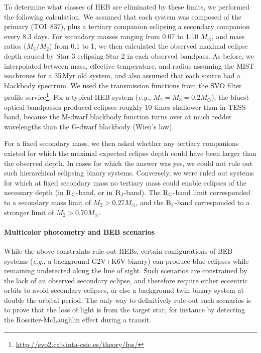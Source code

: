 \documentclass[12pt,twocolumn,tighten]{aastex63}
\newcommand{\tn}{TOI~837} %
\begin{document}
To determine what classes of HEB are eliminated by these limits, we
performed the following calculation.  We assumed that each system was
composed of the primary (\tn), plus a tertiary companion eclipsing a
secondary companion every 8.3 days.  For secondary masses ranging from
0.07 to 1.10 $M_\odot$, and mass ratios ($M_3/M_2$) from 0.1 to 1, we
then calculated the observed maximal eclipse depth caused by Star 3
eclipsing Star 2 in each observed bandpass.  As before, we
interpolated between mass, effective temperature, and radius assuming
the MIST isochrones for a 35$\,$Myr old system, and also assumed that
each source had a blackbody spectrum.  We used the transmission
functions from the SVO filter profile
service\footnote{\url{http://svo2.cab.inta-csic.es/theory/fps/}}.  For
a typical HEB system ({\it e.g.}, $M_2=M_3=0.2M_\odot$), the bluest
optical bandpasses produced eclipses roughly 10 times shallower than
in TESS-band, because the M-dwarf blackbody function turns over at
much redder wavelengths than the G-dwarf blackbody (Wien's law).

For a fixed secondary mass, we then asked whether any tertiary
companions existed for which the maximal expected eclipse depth could have
been larger than the observed depth.  In cases for which the answer
was yes, we could not rule out such hierarchical eclipsing binary
systems.  Conversely, we were ruled out systems for which at fixed
secondary mass no tertiary mass could enable eclipses of the necessary
depth (in ${\rm R_C}$-band, or in ${\rm B_J}$-band).
The ${\rm R_C}$-band limit corresponded to a secondary mass limit of 
$M_2 > 0.27 M_\odot$, and the ${\rm B_J}$-band corresponded to a
stronger limit of $M_2 > 0.70 M_\odot$.


\paragraph{Multicolor photometry and BEB scenarios}

While the above constraints rule out HEBs, certain configurations of BEB systems 
({\it e.g.}, a background G2V+K6V binary)
can produce blue eclipses while remaining undetected along the line of
sight.  Such scenarios are constrained by the lack of an observed
secondary eclipse, and therefore require either eccentric orbits to
avoid secondary eclipses, or else a background twin binary system at
double the orbital period.  The only way to definitively rule out such
scenarios is to prove that the loss of light is from the target star,
for instance by detecting the Rossiter-McLaughlin effect during a
transit.
\end{document}
